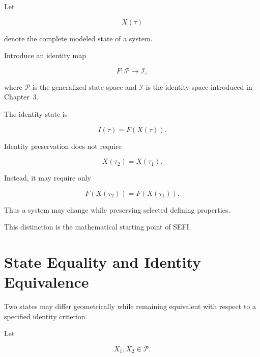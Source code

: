 \documentclass[12pt,oneside]{book}
\begin{document}
Let

\begin{equation}
    X(\tau)
\end{equation}

denote the complete modeled state of a system.

Introduce an identity map

\begin{equation}
    F:
    \mathcal{P}
    \rightarrow
    \mathcal{I},
    \label{eq:identity-map}
\end{equation}

where \(\mathcal{P}\) is the generalized state space and
\(\mathcal{I}\) is the identity space introduced in
Chapter~3.

The identity state is

\begin{equation}
    I(\tau)
    =
    F(X(\tau)).
    \label{eq:identity-state-map}
\end{equation}

Identity preservation does not require

\begin{equation}
    X(\tau_2)
    =
    X(\tau_1).
\end{equation}

Instead, it may require only

\begin{equation}
    F(X(\tau_2))
    =
    F(X(\tau_1)).
    \label{eq:identity-preservation-basic}
\end{equation}

Thus a system may change while preserving selected defining
properties.

This distinction is the mathematical starting point of SEFI.


\section{State Equality and Identity Equivalence}
\label{sec:state-identity-equivalence}

Two states may differ geometrically while remaining equivalent
with respect to a specified identity criterion.

Let

\begin{equation}
    X_1,X_2
    \in
    \mathcal{P}.
\end{equation}
\end{document}
